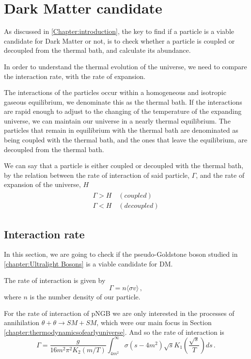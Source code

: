 \chapter{Dark Matter candidate}
\label{chapter:candidate}

As discussed in \autoref{Chapter:introduction}, the key to find if a particle is a viable candidate for Dark Matter or not, is to check whether a particle is coupled or decoupled from the thermal bath, and calculate its abundance. 

In order to understand the thermal evolution of the universe, we need to compare the interaction rate, with the rate of expansion. 

The interactions of the particles occur within a homogeneous and isotropic gaseous equilibrium, we denominate this as the thermal bath. 
If the interactions are rapid enough to adjust to the changing of the temperature of the expanding universe, we can maintain our universe in a nearly thermal equilibrium.
The particles that remain in equilibrium with the thermal bath are denominated as being coupled with the thermal bath, and the ones that leave the equilibrium, are decoupled from the thermal bath.

We can say that a particle is either coupled or decoupled with the thermal bath, by the relation between the rate of interaction of said particle, $\Gamma$, and the rate of expansion of the universe, $H$
\begin{align}
	\label{eq}
	\begin{array}{ll}
		\Gamma > H \quad (coupled) \\
		\Gamma < H \quad (decoupled)
	\end{array}
\end{align}


\section{Interaction rate}

In this section, we are going to check if the pseudo-Goldstone boson studied in \autoref{chapter:Ultralight Bosons} is a viable candidate for DM.

The rate of interaction is given by
\begin{equation}
	\Gamma = n\langle \sigma v \rangle\,,
\end{equation}
where $n$ is the number density of our particle.

For the rate of interaction of pNGB we are only interested in the processes of annihilation $\theta+\theta \rightarrow SM + SM$, which were our main focus in Section \autoref{chapter:thermodynamicsofearlyuniverse}.
And so the rate of interaction is 
\begin{equation}
	\Gamma=\frac{g}{16m^2\pi^2K_2(m/T)}\int_{4m^2}^\infty\sigma(s-4m^2)\sqrt{s}K_1\left(\frac{\sqrt{s}}{T}\right)ds\,.
\end{equation}

